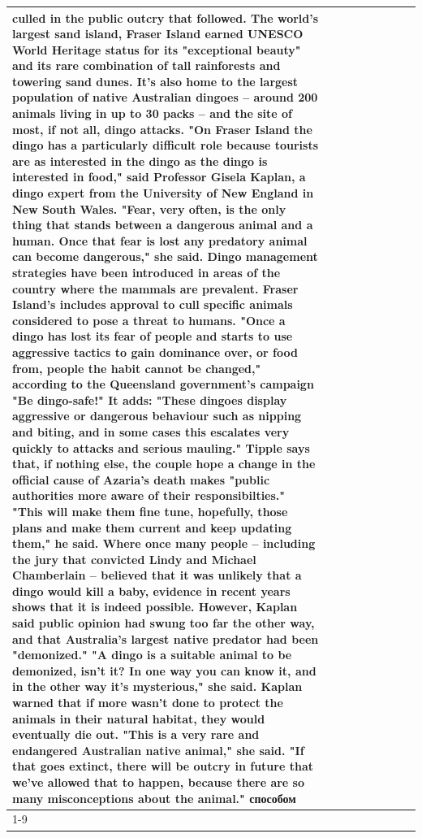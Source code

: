 \begin{table}[H]
\begin{tabular}{lllrlllll}
culled in the public outcry that followed. The world's largest sand island, Fraser Island earned UNESCO World Heritage status for its "exceptional beauty" and its rare combination of tall rainforests and towering sand dunes. It's also home to the largest population of native Australian dingoes -- around 200 animals living in up to 30 packs -- and the site of most, if not all, dingo attacks. "On Fraser Island the dingo has a particularly difficult role because tourists are as interested in the dingo as the dingo is interested in food," said Professor Gisela Kaplan, a dingo expert from the University of New England in New South Wales. "Fear, very often, is the only thing that stands between a dangerous animal and a human. Once that fear is lost any predatory animal can become dangerous," she said. Dingo management strategies have been introduced in areas of the country where the mammals are prevalent. Fraser Island's includes approval to cull specific animals considered to pose a threat to humans. "Once a dingo has lost its fear of people and starts to use aggressive tactics to gain dominance over, or food from, people the habit cannot be changed," according to the Queensland government's campaign "Be dingo-safe!" It adds: "These dingoes display aggressive or dangerous behaviour such as nipping and biting, and in some cases this escalates very quickly to attacks and serious mauling." Tipple says that, if nothing else, the couple hope a change in the official cause of Azaria's death makes "public authorities more aware of their responsibilties." "This will make them fine tune, hopefully, those plans and make them current and keep updating them," he said. Where once many people -- including the jury that convicted Lindy and Michael Chamberlain -- believed that it was unlikely that a dingo would kill a baby, evidence in recent years shows that it is indeed possible. However, Kaplan said public opinion had swung too far the other way, and that Australia's largest native predator had been "demonized." "A dingo is a suitable animal to be demonized, isn't it? In one way you can know it, and in the other way it's mysterious," she said. Kaplan warned that if more wasn't done to protect the animals in their natural habitat, they would eventually die out. "This is a very rare and endangered Australian native animal," she said. "If that goes extinct, there will be outcry in future that we've allowed that to happen, because there are so many misconceptions about the animal." способом \\
\cline{1-9}

\end{tabular}
\end{table}
